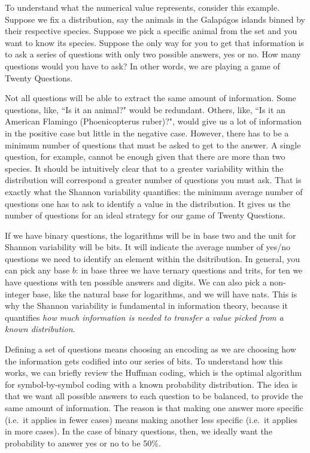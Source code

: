\documentclass[iopart]{revtex4-1}
\begin{document}
To understand what the numerical value represents, consider this example. Suppose we fix a distribution, say the animals in the Galap\'{a}gos islands binned by their respective species. Suppose we pick a specific animal from the set and you want to know its species. Suppose the only way for you to get that information is to ask a series of questions with only two possible answers, yes or no. How many questions would you have to ask? In other words, we are playing a game of Twenty Questions.

Not all questions will be able to extract the same amount of information. Some questions, like, ``Is it an animal?" would be redundant. Others, like, ``Is it an American Flamingo (Phoenicopterus ruber)?", would give us a lot of information in the positive case but little in the negative case. However, there has to be a minimum number of questions that must be asked to get to the answer. A single question, for example, cannot be enough given that there are more than two species. It should be intuitively clear that to a greater variability within the distribution will correspond a greater number of questions you must ask. That is exactly what the Shannon variability quantifies: the minimum average number of questions one has to ask to identify a value in the distribution. It gives us the number of questions for an ideal strategy for our game of Twenty Questions.

If we have binary questions, the logarithms will be in base two and the unit for Shannon variability will be bits. It will indicate the average number of yes/no questions we need to identify an element within the dsitribution. In general, you can pick any base $b$: in base three we have ternary questions and trits, for ten we have questions with ten possible answers and digits. We can also pick a non-integer base, like the natural base for logarithms, and we will have nats. This is why the Shannon variability is fundamental in information theory, because it quantifies \emph{how much information is needed to transfer a value picked from a known distribution}.

Defining a set of questions means choosing an encoding as we are choosing how the information gets codified into our series of bits. To understand how this works, we can briefly review the Huffman coding,\cite{Huffman} which is the optimal algorithm for symbol-by-symbol coding with a known probability distribution. The idea is that we want all possible answers to each question to be balanced, to provide the same amount of information. The reason is that making one answer more specific (i.e.~it applies in fewer cases) means making another less specific (i.e.~it applies in more cases). In the case of binary questions, then, we ideally want the probability to answer yes or no to be 50\%.
\end{document}
